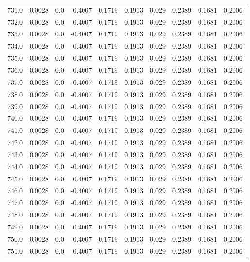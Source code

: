 \begin{longtable}{lrrrrrrrrr}
731.0 & 0.0028 & 0.0 & -0.4007 & 0.1719 & 0.1913 & 0.029 & 0.2389 & 0.1681 & 0.2006 \\
732.0 & 0.0028 & 0.0 & -0.4007 & 0.1719 & 0.1913 & 0.029 & 0.2389 & 0.1681 & 0.2006 \\
733.0 & 0.0028 & 0.0 & -0.4007 & 0.1719 & 0.1913 & 0.029 & 0.2389 & 0.1681 & 0.2006 \\
734.0 & 0.0028 & 0.0 & -0.4007 & 0.1719 & 0.1913 & 0.029 & 0.2389 & 0.1681 & 0.2006 \\
735.0 & 0.0028 & 0.0 & -0.4007 & 0.1719 & 0.1913 & 0.029 & 0.2389 & 0.1681 & 0.2006 \\
736.0 & 0.0028 & 0.0 & -0.4007 & 0.1719 & 0.1913 & 0.029 & 0.2389 & 0.1681 & 0.2006 \\
737.0 & 0.0028 & 0.0 & -0.4007 & 0.1719 & 0.1913 & 0.029 & 0.2389 & 0.1681 & 0.2006 \\
738.0 & 0.0028 & 0.0 & -0.4007 & 0.1719 & 0.1913 & 0.029 & 0.2389 & 0.1681 & 0.2006 \\
739.0 & 0.0028 & 0.0 & -0.4007 & 0.1719 & 0.1913 & 0.029 & 0.2389 & 0.1681 & 0.2006 \\
740.0 & 0.0028 & 0.0 & -0.4007 & 0.1719 & 0.1913 & 0.029 & 0.2389 & 0.1681 & 0.2006 \\
741.0 & 0.0028 & 0.0 & -0.4007 & 0.1719 & 0.1913 & 0.029 & 0.2389 & 0.1681 & 0.2006 \\
742.0 & 0.0028 & 0.0 & -0.4007 & 0.1719 & 0.1913 & 0.029 & 0.2389 & 0.1681 & 0.2006 \\
743.0 & 0.0028 & 0.0 & -0.4007 & 0.1719 & 0.1913 & 0.029 & 0.2389 & 0.1681 & 0.2006 \\
744.0 & 0.0028 & 0.0 & -0.4007 & 0.1719 & 0.1913 & 0.029 & 0.2389 & 0.1681 & 0.2006 \\
745.0 & 0.0028 & 0.0 & -0.4007 & 0.1719 & 0.1913 & 0.029 & 0.2389 & 0.1681 & 0.2006 \\
746.0 & 0.0028 & 0.0 & -0.4007 & 0.1719 & 0.1913 & 0.029 & 0.2389 & 0.1681 & 0.2006 \\
747.0 & 0.0028 & 0.0 & -0.4007 & 0.1719 & 0.1913 & 0.029 & 0.2389 & 0.1681 & 0.2006 \\
748.0 & 0.0028 & 0.0 & -0.4007 & 0.1719 & 0.1913 & 0.029 & 0.2389 & 0.1681 & 0.2006 \\
749.0 & 0.0028 & 0.0 & -0.4007 & 0.1719 & 0.1913 & 0.029 & 0.2389 & 0.1681 & 0.2006 \\
750.0 & 0.0028 & 0.0 & -0.4007 & 0.1719 & 0.1913 & 0.029 & 0.2389 & 0.1681 & 0.2006 \\
751.0 & 0.0028 & 0.0 & -0.4007 & 0.1719 & 0.1913 & 0.029 & 0.2389 & 0.1681 & 0.2006 \\

\end{longtable}
